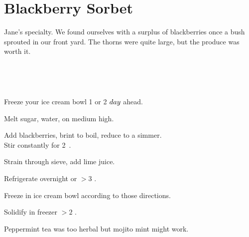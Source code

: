 \section{Blackberry Sorbet}

\begin{recipestats}[
        servings=4,
        preptime=30~\minute,
        bakingtime=15~\minute,
        inactivetime=12~\hour,
        source=Jane \& Mike,
        original=\citeauthor{sonomaSorbet}~\cite{sonomaSorbet},
    ]
\end{recipestats}

\begin{recipeabstract}
    Jane's specialty.
    We found ourselves with a surplus of blackberries once a bush sprouted in our front yard.
    The thorns were quite large, but the produce was worth it.
\end{recipeabstract}

\begin{ingredientcolumns}
    \begin{ingredientblock}
        \\
    \end{ingredientblock}
    \begin{ingredientblock}
        \\
    \end{ingredientblock}
\end{ingredientcolumns}

\begin{preparation}
\item Freeze your ice cream bowl 1 or 2 $day$ ahead.
\item Melt sugar,  water, on medium high.
\item Add blackberries, brint to boil, reduce to a simmer.\\
    Stir constantly for 2~\minute.
\item Strain through sieve, add lime juice.
\item Refrigerate overnight or $>3$ \hour.
\item Freeze in ice cream bowl according to those directions.
\item Solidify in freezer $>2$ \hour.
\end{preparation}

\begin{experiments}
\item Peppermint tea was too herbal but mojito mint might work.
\end{experiments}
\recipeend%

